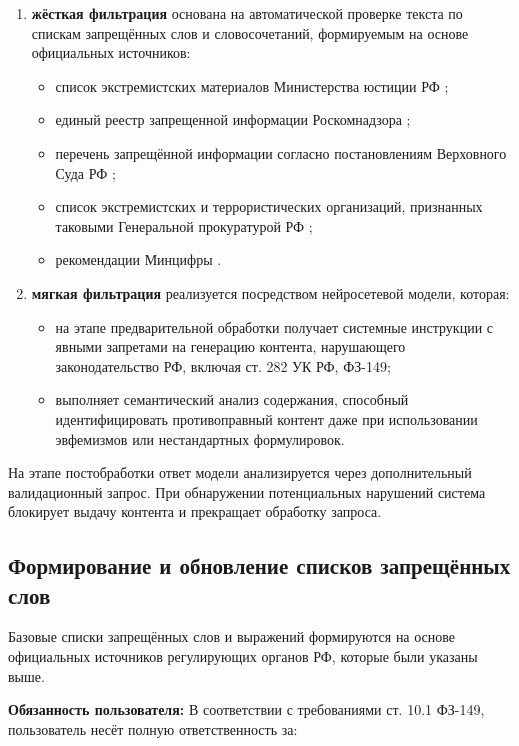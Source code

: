 \begin{enumerate}
	\item \textbf{жёсткая фильтрация} основана на автоматической проверке текста по спискам запрещённых слов и словосочетаний, формируемым на основе официальных источников:
	\begin{itemize}
		\item список экстремистских материалов Министерства юстиции РФ \cite{minust};
		\item единый реестр запрещенной информации Роскомнадзора \cite{rkn};
		\item перечень запрещённой информации согласно постановлениям Верховного Суда РФ \cite{verh_sud};
		\item список экстремистских и террористических организаций, признанных таковыми Генеральной прокуратурой РФ \cite{prokur};
		\item рекомендации Минцифры \cite{min_cifr}.
	\end{itemize}
	
	\item \textbf{мягкая фильтрация} реализуется посредством нейросетевой модели, которая:
	\begin{itemize}
		\item на этапе предварительной обработки получает системные инструкции с явными запретами на генерацию контента, нарушающего законодательство РФ, включая ст. 282 УК РФ, ФЗ-149;
		\item выполняет семантический анализ содержания, способный идентифицировать противоправный контент даже при использовании эвфемизмов или нестандартных формулировок.
	\end{itemize}
\end{enumerate}

На этапе постобработки ответ модели анализируется через дополнительный валидационный запрос. При обнаружении потенциальных нарушений система блокирует выдачу контента и прекращает обработку запроса.

\subsection{Формирование и обновление списков запрещённых слов}
Базовые списки запрещённых слов и выражений формируются на основе официальных источников регулирующих органов РФ, которые были указаны выше.

\textbf{Обязанность пользователя:} В соответствии с требованиями ст. 10.1 \mbox{ФЗ-149}, пользователь несёт полную ответственность за:

